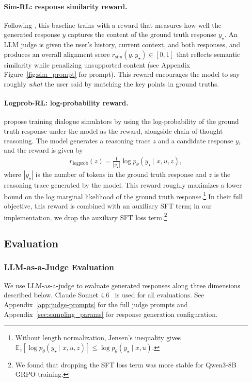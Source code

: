 \documentclass[11pt]{article}
\begin{document}
\paragraph{Sim-RL: response similarity reward.}
Following \citet{wu2026humanlm}, this baseline trains with a reward that measures how well the generated response $y$ captures the content of the ground truth response $y_\star$. An LLM judge is given the user's history, current context, and both responses, and produces an overall alignment score $r_{\mathrm{sim}}(y, y_\star) \in [0,1]$ that reflects semantic similarity while penalizing unsupported content (see Appendix Figure~\ref{fig:sim_prompt} for prompt). This reward encourages the model to say roughly \emph{what} the user said by matching the key points in ground truths.

\paragraph{Logprob-RL: log-probability reward.}
\citet{gandhi2026dialogue} propose training dialogue simulators by using the log-probability of the ground truth response under the model as the reward, alongside chain-of-thought reasoning. The model generates a reasoning trace $z$ and a candidate response $y$, and the reward is given by
\begin{align*}
r_{\mathrm{logprob}}(z) = \frac{1}{|y_\star|}\log p_\theta(y_\star \mid x, u, z),
\end{align*}
where $|y_\star|$ is the number of tokens in the ground truth response and $z$ is the reasoning trace generated by the model. This reward roughly maximizes a lower bound on the log marginal likelihood of the ground truth response.\footnote{Without length normalization, Jensen's inequality gives $\mathbb{E}_z[\log p_\theta(y_\star \mid x,u,z)] \leq \log p_\theta(y_\star \mid x,u)$.}
In their full objective, this reward is combined with an auxiliary SFT term; in our implementation, we drop the auxiliary SFT loss term.\footnote{We found that dropping the SFT loss term was more stable for Qwen3-8B GRPO training.}

\subsection{Evaluation}
\subsubsection{LLM-as-a-Judge Evaluation}
We use LLM-as-a-judge to evaluate generated responses along three dimensions described below. Claude Sonnet 4.6~\citep{anthropic2026claudesonnet46} is used for all evaluations. See Appendix~\ref{app:judge-prompts} for the full judge prompts and Appendix~\ref{sec:sampling_params} for response generation configuration.
\end{document}

